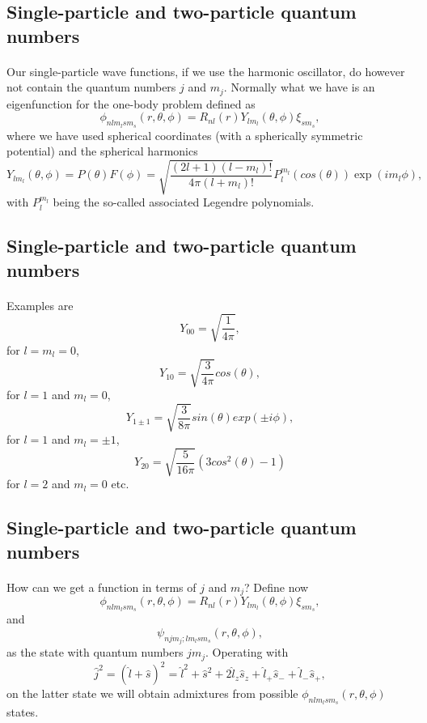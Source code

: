 \documentclass[%
twoside,                 %
final,                   %
10pt]{article}
\begin{document}
\subsection*{Single-particle and two-particle quantum numbers}

\paragraph{}
Our single-particle wave functions, if we use the harmonic oscillator, do however not contain the quantum numbers $j$ and $m_j$.
Normally what we have is an eigenfunction for the one-body problem defined as
\[
\phi_{nlm_lsm_s}(r,\theta,\phi)=R_{nl}(r)Y_{lm_l}(\theta,\phi)\xi_{sm_s},
\]
where we have used spherical coordinates (with a spherically symmetric potential) and the spherical harmonics
\[
    Y_{lm_l}(\theta,\phi)=P(\theta)F(\phi)=\sqrt{\frac{(2l+1)(l-m_l)!}{4\pi (l+m_l)!}}
                      P_l^{m_l}(cos(\theta))\exp{(im_l\phi)},
\]
with $P_l^{m_l}$ being the so-called associated Legendre polynomials.





\subsection*{Single-particle and two-particle quantum numbers}

\paragraph{}
Examples are
\[
   Y_{00}=\sqrt{\frac{1}{4\pi}},
\]
for $l=m_l=0$, 
\[
   Y_{10}=\sqrt{\frac{3}{4\pi}}cos(\theta),
\]
for $l=1$ and $m_l=0$, 
\[
   Y_{1\pm 1}=\sqrt{\frac{3}{8\pi}}sin(\theta)exp(\pm i\phi),
\]
for  $l=1$ and $m_l=\pm 1$, 
\[
   Y_{20}=\sqrt{\frac{5}{16\pi}}(3cos^2(\theta)-1)
\]
for $l=2$ and $m_l=0$ etc.






\subsection*{Single-particle and two-particle quantum numbers}

\paragraph{}
How can we get a function in terms of $j$ and $m_j$?
Define now
\[
\phi_{nlm_lsm_s}(r,\theta,\phi)=R_{nl}(r)Y_{lm_l}(\theta,\phi)\xi_{sm_s},
\]
and
\[
\psi_{njm_j;lm_lsm_s}(r,\theta,\phi),
\]
as the state with quantum numbers $jm_j$.
Operating with 
\[
   \hat{j}^2=(\hat{l}+\hat{s})^2=\hat{l}^2+\hat{s}^2+2\hat{l}_z\hat{s}_z+\hat{l}_+\hat{s}_{-}+\hat{l}_{-}\hat{s}_{+},
\]
on the latter state we will obtain admixtures from possible $\phi_{nlm_lsm_s}(r,\theta,\phi)$ states.
\end{document}
